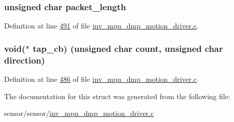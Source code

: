 \subsubsection[{\texorpdfstring{packet\+\_\+length}{packet_length}}]{\setlength{\rightskip}{0pt plus 5cm}unsigned char packet\+\_\+length}\hypertarget{structdmp__s_a6423143ff761c75d97f34c8465393ea0}{}\label{structdmp__s_a6423143ff761c75d97f34c8465393ea0}


Definition at line \hyperlink{inv__mpu__dmp__motion__driver_8c_source_l00491}{491} of file \hyperlink{inv__mpu__dmp__motion__driver_8c_source}{inv\+\_\+mpu\+\_\+dmp\+\_\+motion\+\_\+driver.\+c}.

\subsubsection[{\texorpdfstring{tap\+\_\+cb}{tap_cb}}]{\setlength{\rightskip}{0pt plus 5cm}void($\ast$ tap\+\_\+cb) (unsigned char count, unsigned char direction)}\hypertarget{structdmp__s_a45a59366dd83331a3ae376edeb5b9e94}{}\label{structdmp__s_a45a59366dd83331a3ae376edeb5b9e94}


Definition at line \hyperlink{inv__mpu__dmp__motion__driver_8c_source_l00486}{486} of file \hyperlink{inv__mpu__dmp__motion__driver_8c_source}{inv\+\_\+mpu\+\_\+dmp\+\_\+motion\+\_\+driver.\+c}.



The documentation for this struct was generated from the following file\+:\begin{DoxyCompactItemize}
\item 
sensor/sensor/\hyperlink{inv__mpu__dmp__motion__driver_8c}{inv\+\_\+mpu\+\_\+dmp\+\_\+motion\+\_\+driver.\+c}\end{DoxyCompactItemize}
